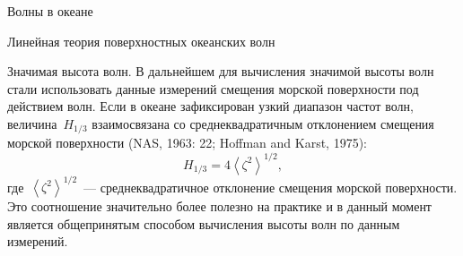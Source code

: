 \begin{chapter}{Волны в океане}
\begin{section}{Линейная теория поверхностных океанских волн}
\begin{paragraph}{Значимая высота волн.}
В дальнейшем для вычисления значимой высоты волн стали использовать данные
измерений смещения морской поверхности под действием волн. Если в океане
зафиксирован узкий диапазон частот волн, величина~$H_{1/3}$ взаимосвязана
со среднеквадратичным отклонением смещения морской поверхности
(NAS, 1963: 22; Hoffman and Karst, 1975):
\begin{equation}
 H_{1/3} = 4 \left< \zeta ^{2}\right>^{1/2},
\end{equation}
где~$ \left< \zeta ^{2}\right>^{1/2}$~--- среднеквадратичное отклонение
смещения морской поверхности. Это соотношение значительно более полезно
на практике и в данный момент является общепринятым способом вычисления
высоты волн по данным измерений.
%
\end{paragraph}
\end{section}


\end{chapter}
